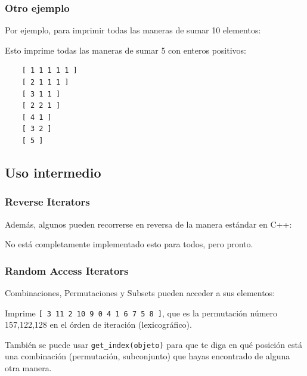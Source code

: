 \documentclass[spanish,professionalfonts]{beamer}
\begin{document}
\begin{frame}[fragile]\frametitle{Otro ejemplo}
  Por ejemplo, para imprimir todas las maneras de sumar 10 elementos:
  \partsencillo
  
  Esto imprime todas las maneras de sumar 5 con enteros positivos:
  \begin{verbatim}
    [ 1 1 1 1 1 ]
    [ 2 1 1 1 ]
    [ 3 1 1 ]
    [ 2 2 1 ]
    [ 4 1 ]
    [ 3 2 ]
    [ 5 ]
  \end{verbatim}
\end{frame}

\subsection{Uso intermedio}

\begin{frame}\frametitle{Reverse Iterators}
  Además, algunos pueden recorrerse en reversa de la manera estándar en C++:
  \combreversa
  
  No está completamente implementado esto para todos, pero pronto.
\end{frame}


\begin{frame}\frametitle{Random Access Iterators}
  Combinaciones, Permutaciones y Subsets pueden acceder a sus elementos:
  \permRA
  
  Imprime \texttt{[ 3 11 2 10 9 0 4 1 6 7 5 8 ]}, que es la permutación número 157,122,128 en el órden de iteración (lexicográfico). \pause
	
	\vspace{0.1cm}
	También se puede usar \texttt{get\_index(objeto)} para que te diga en qué posición está una combinación (permutación, subconjunto) que hayas encontrado de alguna otra manera.
\end{frame}
\end{document}
